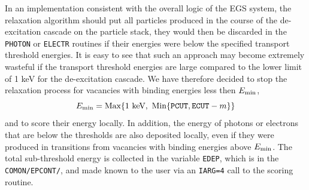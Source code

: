 In an implementation consistent with the overall logic 
of the EGS system, the relaxation algorithm should 
put all particles produced in the course of the 
de-excitation cascade on the particle stack, they would 
then be discarded in the {\tt PHOTON} or {\tt ELECTR} 
routines if their energies were below the specified 
transport threshold energies. It is easy to see that 
such an approach may become extremely wasteful if 
the transport threshold energies are large compared to 
the lower limit of 1 keV for the de-excitation cascade. 
We have therefore decided to stop the relaxation process 
for vacancies with binding energies less then $E_{\rm min}$,
\begin{equation}
E_{\rm min} = \mbox{Max} \{ 1~\mbox{keV},~\mbox{Min} 
\{ {\tt PCUT}, {\tt ECUT} - m \} \}
\end{equation} 
and to score their energy locally. In addition, 
the energy of photons or electrons that are below 
the thresholds are also deposited locally, even if 
they were produced in transitions from vacancies 
with binding energies above $E_{\rm min}$. 
The total sub-threshold energy is collected in 
the variable {\tt EDEP}, which is in the {\tt COMON/EPCONT/},  
and made known to the 
user via an {\tt IARG=4} call to the scoring routine. 

